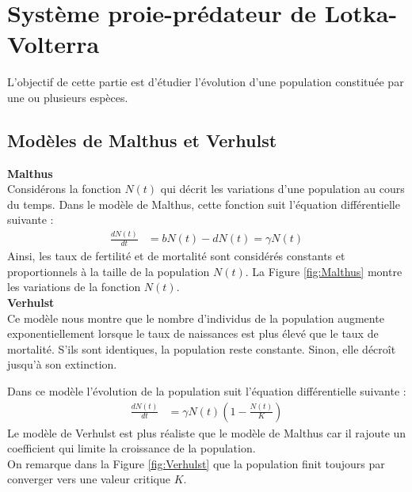 \section{Système proie-prédateur de Lotka-Volterra}

L'objectif de cette partie est d'étudier l'évolution d'une population constituée par une ou plusieurs espèces.
\subsection{Modèles de Malthus et Verhulst}

\textbf{Malthus}\\

Considérons la fonction $N(t)$ qui décrit les variations d'une population au cours du temps. Dans le modèle de Malthus, cette fonction suit l'équation différentielle suivante :
\begin{align}
    \frac{dN(t)}{dt} &= bN(t) - dN(t) = \gamma N(t)
\end{align}
Ainsi, les taux de fertilité et de mortalité sont  considérés constants et proportionnels à la taille de la population $N(t)$. La Figure \ref{fig:Malthus} montre les variations de la fonction $N(t)$. \\%

\textbf{Verhulst}\\

Ce modèle nous montre que le nombre d'individus de la population augmente exponentiellement lorsque le taux de naissances est plus élevé que le taux de mortalité. S'ils sont identiques, la population reste constante. Sinon, elle décroît jusqu'à son extinction. 


Dans ce modèle l'évolution de la population suit l'équation différentielle suivante :
\begin{align}
    \frac{dN(t)}{dt} &= \gamma N(t) (1 - \frac{N(t)}{K}) 
\end{align}
Le modèle de Verhulst est plus réaliste que le modèle de Malthus car il rajoute un coefficient qui limite la croissance de la population. \\

On remarque dans la Figure \ref{fig:Verhulst} que la population finit toujours par converger vers une valeur critique $K$.

